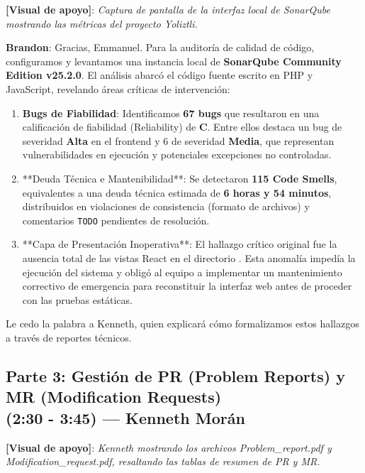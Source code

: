 \documentclass[12pt]{article}
\begin{document}
\noindent \textbf{[Visual de apoyo]}: \textit{Captura de pantalla de la interfaz local de SonarQube mostrando las métricas del proyecto Yoliztli.}
\medskip

\noindent \textbf{Brandon}: Gracias, Emmanuel. Para la auditoría de calidad de código, configuramos y levantamos una instancia local de \textbf{SonarQube Community Edition v25.2.0}. El análisis abarcó el código fuente escrito en PHP y JavaScript, revelando áreas críticas de intervención:

\begin{enumerate}
    \item \textbf{Bugs de Fiabilidad}: Identificamos \textbf{67 bugs} que resultaron en una calificación de fiabilidad (Reliability) de \textbf{C}. Entre ellos destaca un bug de severidad \textbf{Alta} en el frontend y 6 de severidad \textbf{Media}, que representan vulnerabilidades en ejecución y potenciales excepciones no controladas.
    \item **Deuda Técnica e Mantenibilidad**: Se detectaron \textbf{115 Code Smells}, equivalentes a una deuda técnica estimada de \textbf{6 horas y 54 minutos}, distribuidos en violaciones de consistencia (formato de archivos) y comentarios \texttt{TODO} pendientes de resolución.
    \item **Capa de Presentación Inoperativa**: El hallazgo crítico original fue la ausencia total de las vistas React en el directorio . Esta anomalía impedía la ejecución del sistema y obligó al equipo a implementar un mantenimiento correctivo de emergencia para reconstituir la interfaz web antes de proceder con las pruebas estáticas.
\end{enumerate}

Le cedo la palabra a Kenneth, quien explicará cómo formalizamos estos hallazgos a través de reportes técnicos.

\newpage

\subsection{Parte 3: Gestión de PR (Problem Reports) y MR (Modification Requests) \texorpdfstring{\\}{---} (2:30 - 3:45) --- Kenneth Morán}

\noindent \textbf{[Visual de apoyo]}: \textit{Kenneth mostrando los archivos Problem\_report.pdf y Modification\_request.pdf, resaltando las tablas de resumen de PR y MR.}
\medskip
\end{document}

